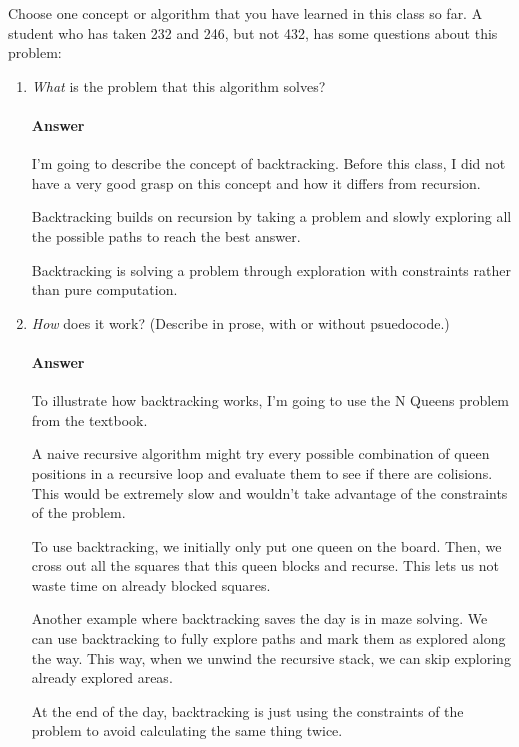 \documentclass{article}
\begin{document}
\collab{}

Choose one concept or algorithm that you have learned
in this class so far. A student who has
taken 232 and 246, but not 432, has some questions about this problem:

\begin{enumerate}
    \item \emph{What} is the problem that this algorithm solves?

        \paragraph{Answer}
        I'm going to describe the concept of backtracking. Before this class, I did
        not have a very good grasp on this concept and how it differs from recursion.

        Backtracking builds on recursion by taking a problem and slowly exploring
        all the possible paths to reach the best answer.

        Backtracking is solving a problem through exploration with constraints rather than pure
        computation.

    \item \emph{How} does it work? (Describe in prose, with or without
        psuedocode.)

        \paragraph{Answer}
        To illustrate how backtracking works, I'm going to use the N Queens problem
        from the textbook.

        A naive recursive algorithm might try every possible combination of queen
        positions in a recursive loop and evaluate them to see if there are colisions. This would be
        extremely slow and wouldn't take advantage of the constraints of the problem.

        To use backtracking, we initially only put one queen on the board. Then,
        we cross out all the squares that this queen blocks and recurse. This lets
        us not waste time on already blocked squares.

        Another example where backtracking saves the day is in maze solving. We
        can use backtracking to fully explore paths and mark them as explored along
        the way. This way, when we unwind the recursive stack, we can skip exploring
        already explored areas.

        At the end of the day, backtracking is just using the constraints of the
        problem to avoid calculating the same thing twice.

\end{enumerate}
\end{document}
